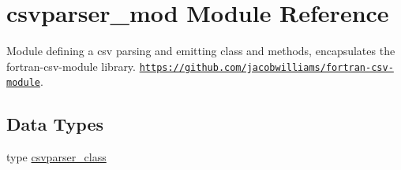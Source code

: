 \hypertarget{namespacecsvparser__mod}{}\section{csvparser\+\_\+mod Module Reference}
\label{namespacecsvparser__mod}


Module defining a csv parsing and emitting class and methods, encapsulates the fortran-\/csv-\/module library. \href{https://github.com/jacobwilliams/fortran-csv-module}{\tt https\+://github.\+com/jacobwilliams/fortran-\/csv-\/module}.  


\subsection*{Data Types}
\begin{DoxyCompactItemize}
\item 
type \mbox{\hyperlink{structcsvparser__mod_1_1csvparser__class}{csvparser\+\_\+class}}
\end{DoxyCompactItemize}
